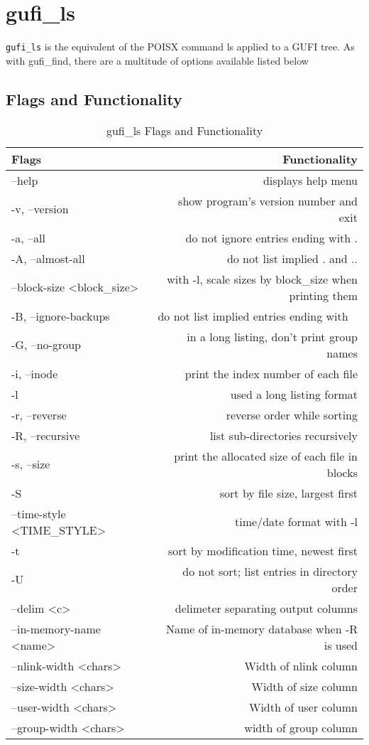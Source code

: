 \section{gufi\_ls}
\texttt{gufi\_ls} is the equivalent of the POISX command ls applied to a GUFI tree. As with gufi\_find, there are a multitude of options available listed below

\subsection{Flags and Functionality}
\begin{table} [h]
\centering
\begin{tabular}{l|r}
Flags & Functionality\\\hline
--help & displays help menu\\
-v, --version & show program's version number and exit \\
-a, --all & do not ignore entries ending with .\\
-A, --almost-all & do not list implied . and .. \\
--block-size \textless block\_size\textgreater & with -l, scale sizes by block\_size when printing them \\
-B, --ignore-backups & do not list implied entries ending with ~\\
-G, --no-group & in a long listing, don't print group names\\
-i, --inode & print the index number of each file\\
-l & used a long listing format\\
-r, --reverse & reverse order while sorting\\
-R, --recursive & list sub-directories recursively\\
-s, --size & print the allocated size of each file in blocks\\
-S & sort by file size, largest first \\
--time-style \textless TIME\_STYLE\textgreater & time/date format with -l\\
-t & sort by modification time, newest first\\
-U & do not sort; list entries in directory order\\
--delim \textless c\textgreater & delimeter separating output columns\\ 
--in-memory-name \textless name\textgreater & Name of in-memory database when -R is used\\
--nlink-width \textless chars\textgreater & Width of nlink column\\
--size-width \textless chars\textgreater & Width of size column\\
--user-width \textless chars\textgreater & Width of user column\\
--group-width \textless chars\textgreater & width of group column
\end{tabular}
\caption{\label{fig:gufi_ls flags}{gufi\_ls Flags and Functionality}}
\end{table}
